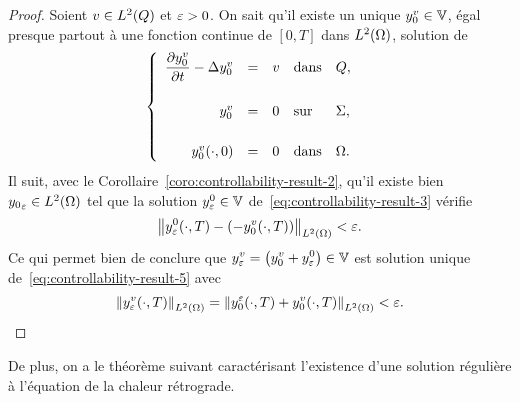 \begin{proof}%
    Soient $v\in L^{2}\!\left({Q}\right)$ et $\varepsilon > 0$. On sait qu'il existe un unique
    $y_{0}^{v}\in \mathbb{V}$, égal presque partout à une fonction continue de
    $[0,T]$ dans $L^{2}\!\left({\Omega}\right)$, solution de
    \begin{equation*}\label{eq:controllability-proof-39}
        \begin{cases}\displaystyle
            \begin{array}{rclll}
                \dfrac{\partial{}y_{0}^{v}}{\partial{}t} - \Delta y_{0}^{v} & = & v &
                \text{dans} & Q,\\
                \\
                y_{0}^{v} & = & 0 & \text{sur} & \Sigma,\\
                \\
                y_{0}^{v}\!\left({\cdot,0}\right) & = & 0 & \text{dans} &
                \Omega.
            \end{array}
        \end{cases}
    \end{equation*}
    Il suit, avec le
    Corollaire~\ref{coro:controllability-result-2}, qu'il existe bien
    ${y_{0}}_{\varepsilon}\in L^{2}\!\left({\Omega}\right)$ tel que la solution
    $y_{\varepsilon}^{0}\in \mathbb{V}$ de~\eqref{eq:controllability-result-3} vérifie
    \begin{equation*}\label{eq:controllability-proof-40}
        \normeohm{%
            y_{\veps}^{0}\!\left({\cdot,T}\right) - \left({%
                -y_{0}^{v}\!\left({\cdot,T}\right)
            }\right)
        } < \veps.
    \end{equation*}
    Ce qui permet bien de conclure que $\displaystyle y_{\veps}^{v} =
    \left({%
        y_{0}^{v} + y_{\veps}^{0}
    }\right) \in \Vbb$ est solution unique
    de~\eqref{eq:controllability-result-5} avec
    \begin{equation*}
        \normeohm{y_{\veps}^{v}\!\left({\cdot,T}\right)} = \normeohm{%
            y_{0}^{\veps}\!\left({\cdot,T}\right) +
            y_{0}^{v}\!\left({\cdot,T}\right)
        } < \veps.
    \end{equation*}
\end{proof}

De plus, on a le théorème suivant caractérisant l'existence d'une solution
régulière à l'équation de la chaleur rétrograde.

